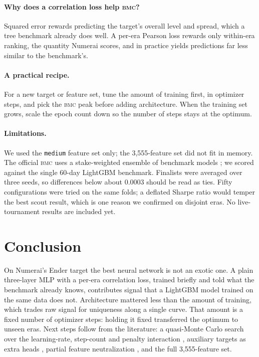 \documentclass[11pt]{article}
\newcommand{\bmc}{\textsc{bmc}}
\begin{document}
\paragraph{Why does a correlation loss help \bmc{}?} Squared error rewards predicting the
target's overall level and spread, which a tree benchmark already does well. A per-era Pearson
loss rewards only within-era ranking, the quantity Numerai scores, and in practice yields
predictions far less similar to the benchmark's.

\paragraph{A practical recipe.} For a new target or feature set, tune the amount of training
first, in optimizer steps, and pick the \bmc{} peak before adding architecture. When the
training set grows, scale the epoch count down so the number of steps stays at the optimum.

\paragraph{Limitations.} We used the \texttt{medium} feature set only; the 3,555-feature set did
not fit in memory. The official \bmc{} uses a stake-weighted ensemble of benchmark models
\citep{numerai_scoring}; we scored against the single 60-day LightGBM benchmark. Finalists were averaged over three
seeds, so differences below about 0.0003 should be read as ties. Fifty configurations
were tried on the same folds; a deflated Sharpe ratio \citep{bailey2014deflated} would temper
the best scout result, which is one reason we confirmed on disjoint eras. No live-tournament
results are included yet.

\section{Conclusion}

On Numerai's Ender target the best neural network is not an exotic one. A plain three-layer
MLP with a per-era correlation loss, trained briefly and told what the benchmark already knows,
contributes signal that a LightGBM model trained on the same data does not. Architecture
mattered less than the amount of training, which trades raw signal for uniqueness along a single
curve. That amount is a fixed number of optimizer steps: holding it fixed transferred the
optimum to unseen eras. Next steps follow from the literature: a quasi-Monte Carlo search over
the learning-rate, step-count and penalty interaction \citep{bousquet2017critical}, auxiliary
targets as extra heads \citep{forum_new_targets}, partial feature neutralization
\citep{forum_neutralization_bias}, and the full 3,555-feature set.
\end{document}
